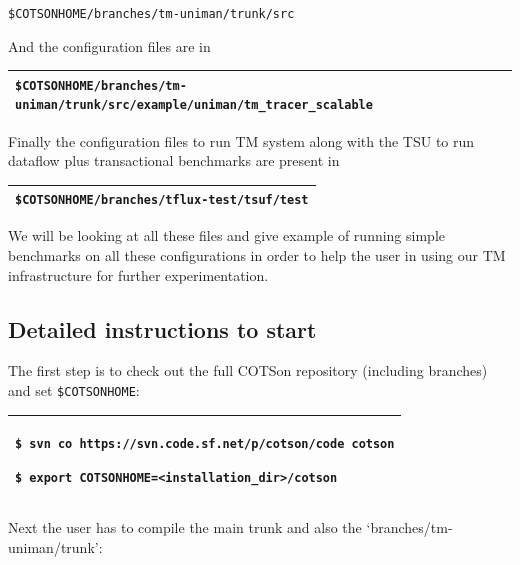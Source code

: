 \documentclass[a4paper]{article}
\begin{document}
{
\texttt{\$COTSONHOME/branches/tm-uniman/trunk/src}}

{
And the configuration files are in}

\begin{flushleft}
\tablehead{}
\begin{supertabular}{|m{6.29346in}|}
\hline
{}
\texttt{\$COTSONHOME/branches/tm-uniman/trunk/src/example/uniman/tm\_tracer\_scalable}\\\hline
\end{supertabular}
\end{flushleft}
{
Finally the configuration files to run TM system along with the TSU to
run dataflow plus transactional benchmarks are present in}

\begin{flushleft}
\tablehead{}
\begin{supertabular}{|m{6.29346in}|}
\hline
{}
\texttt{\$COTSONHOME/branches/tflux-test/tsuf/test}\\\hline
\end{supertabular}
\end{flushleft}
{
We will be looking at all these files and give example of running simple
benchmarks on all these configurations in order to help the user in
using our TM infrastructure for further experimentation.}

\subsection[Detailed instructions to start]{Detailed instructions to
start}
{
The first step is to check out the full COTSon repository (including
branches) and set \texttt{\$COTSONHOME}:}

\begin{flushleft}
\tablehead{}
\begin{supertabular}{|m{6.29346in}|}
\hline
{ \texttt{\$ svn co
}\texttt{https://svn.code.sf.net/p/cotson/code cotson}}

 \texttt{\$ export
COTSONHOME={\textless}installation\_dir{\textgreater}/cotson}\\\hline
\end{supertabular}
\end{flushleft}
{
Next the user has to compile the main trunk and also the
{\textquoteleft}branches/tm-uniman/trunk{\textquoteright}:}
\end{document}
